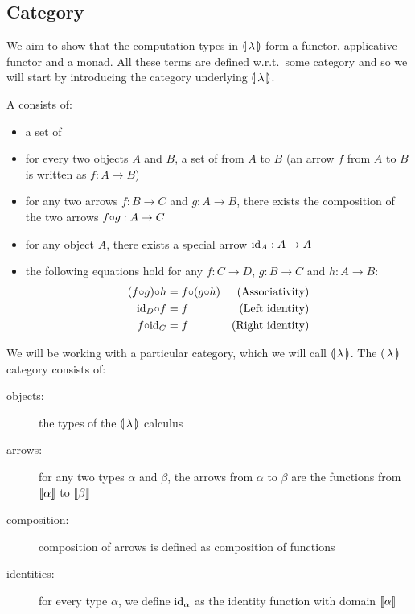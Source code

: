\subsection{Category}
\label{ssec:category}

We aim to show that the computation types in $\llparenthesis \, \lambda \, \rrparenthesis$ form a
functor, applicative functor and a monad. All these terms are defined
w.r.t.\ some category and so we will start by introducing the category
underlying $\llparenthesis \, \lambda \, \rrparenthesis$.

\begin{definition}
 A  consists of:
\begin{itemize}
\item a set of 
\item for every two objects $A$ and $B$, a set of  from $A$
  to $B$ (an arrow $f$ from $A$ to $B$ is written as $f : A \to B$)
\item for any two arrows $f : B \to C$ and $g : A \to B$, there exists the
  composition of the two arrows $f {\mathbin{\circ}} g : A \to C$
\item for any object $A$, there exists a special arrow $\mathrm{id}_A : A \to A$
\item the following equations hold for any $f : C \to D$, $g : B \to C$ and
  $h : A \to B$:
  \begin{align}
    \label{law:cat-associativity}(f {\mathbin{\circ}} g) {\mathbin{\circ}} h &= f {\mathbin{\circ}} (g {\mathbin{\circ}} h) & \text{(Associativity)} \\
    \label{law:cat-left-identity}\mathrm{id}_D {\mathbin{\circ}} f &= f & \text{(Left identity)} \\
    \label{law:cat-right-identity}f {\mathbin{\circ}} \mathrm{id}_C &= f & \text{(Right identity)}
  \end{align}
\end{itemize}
\end{definition}

We will be working with a particular category, which we will call
$\llparenthesis \, \lambda \, \rrparenthesis$. The $\llparenthesis \, \lambda \, \rrparenthesis$ category consists of:
\begin{description}
\item[objects:] the types of the $\llparenthesis \, \lambda \, \rrparenthesis$ calculus
\item[arrows:] for any two types $\alpha$ and $\beta$, the arrows from
  $\alpha$ to $\beta$ are the functions from $\llbracket \alpha \rrbracket$ to
  $\llbracket \beta \rrbracket$
\item[composition:] composition of arrows is defined as composition of functions
\item[identities:] for every type $\alpha$, we define $\mathrm{id}_\alpha$ as the
  identity function with domain $\llbracket \alpha \rrbracket$
\end{description}

